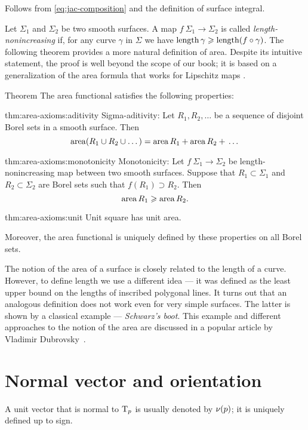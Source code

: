 Follows from \ref{eq:jac-composition} and the definition of surface integral.
\qeds

Let $\Sigma_1$ and $\Sigma_2$ be two smooth surfaces.
A map $f\:\Sigma_1\to \Sigma_2$ is called \emph{length-nonincreasing} if, for any curve $\gamma$ in $\Sigma$ we have $\length\gamma\z\ge \length (f\circ\gamma)$. 
The following theorem provides a more natural definition of area.
Despite its intuitive statement, the proof is well beyond the scope of our book;
it is based on a generalization of the area formula that works for Lipschitz maps \cite[3.2.3]{federer}.

\begin{thm}{Theorem}\label{thm:area-axioms}
The area functional satisfies the following properties:

\begin{subthm}{thm:area-axioms:aditivity}
Sigma-aditivity: 
Let $R_1,R_2,\dots$ be a sequence of disjoint Borel sets in a smooth surface.
Then 
\[\mathop{\rm area}\nolimits (R_1\cup R_2\cup \dots)=\mathop{\rm area}\nolimits R_1+\mathop{\rm area}\nolimits R_2+{}\dots\]
\end{subthm}

\begin{subthm}{thm:area-axioms:monotonicity}
Monotonicity:
Let $f\:\Sigma_1\to \Sigma_2$ be length-nonincreasing map between two smooth surfaces.
Suppose that $R_1\subset \Sigma_1$ and $R_2\subset \Sigma_2$ are Borel sets such that $f(R_1)\supset R_2$.
Then 
\[\mathop{\rm area}\nolimits R_1\geqslant \mathop{\rm area}\nolimits R_2.\]
\end{subthm}

\begin{subthm}{thm:area-axioms:unit}
Unit square has unit area. 
\end{subthm}

Moreover, the area functional is uniquely defined by these properties on all Borel sets.
\end{thm}

The notion of the area of a surface is closely related to the length of a curve.
However, to define length we use a different idea --- it was defined as the least upper bound on the lengths of inscribed polygonal lines.
It turns out that an analogous definition does not work even for very simple surfaces.
The latter is shown by a classical example --- \textit{Schwarz's boot}.
This example and different approaches to the notion of the area are discussed in a popular article by Vladimir Dubrovsky~\cite{dubrovsky}.

\section{Normal vector and orientation}
A unit vector that is normal to $\mathrm{T}_p$ is usually denoted by $\nu(p)$;
it is uniquely defined up to sign.

